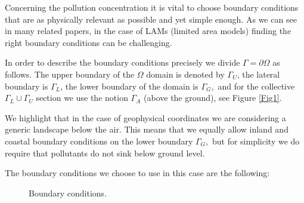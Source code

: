 \documentclass[11pt]{article}
\begin{document}
Concerning the pollution concentration it is vital to choose boundary conditions that are as physically relevant as possible and yet simple enough. As we can see in many related papers, in the case of LAMs (limited area models) finding the right boundary conditions can be challenging.

In order to describe the boundary conditions precisely we divide $\Gamma = \partial \Omega$ as follows. The upper boundary of the $\Omega$ domain is denoted by $\Gamma_U$, the lateral boundary is $\Gamma_L$, the lower boundary of the domain is $\Gamma_G,$ and for the collective $\Gamma_L \cup \Gamma_U$ section we use the notion $\Gamma_A$ (above the ground), see Figure \ref{Fig1}.

We highlight that in the case of geophysical coordinates we are considering a generic landscape below the air. This means that we equally allow inland and coastal boundary conditions on the lower boundary $\Gamma_G,$ but for simplicity we do require that pollutants do not sink below ground level.

The boundary conditions we choose to use in this case are the following:

\begin{figure}[!h]
  \centering
  \caption{Boundary conditions.}
\label{BC-Fig}
\end{figure}
\end{document}
